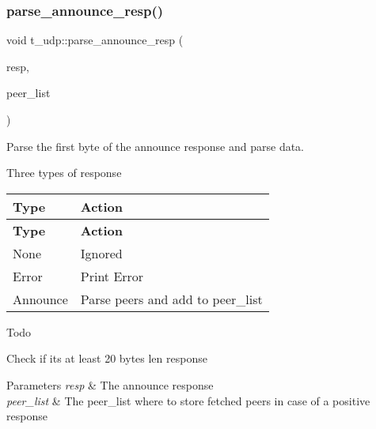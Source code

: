 \subsubsection{\texorpdfstring{parse\+\_\+announce\+\_\+resp()}{parse\_announce\_resp()}}
{\footnotesize\ttfamily void t\+\_\+udp\+::parse\+\_\+announce\+\_\+resp (\begin{DoxyParamCaption}\item[{std\+::vector$<$ uint8\+\_\+t $>$ \&}]{resp,  }\item[{\hyperlink{namespacepwp_ad07fa6df116b205302ad5ec172277184}{pwp\+::\+Peer\+List}}]{peer\+\_\+list }\end{DoxyParamCaption})}



Parse the first byte of the announce response and parse data. 

Three types of response

\tabulinesep=1mm
\begin{longtabu} spread 0pt [c]{*{2}{|X[-1]}|}
\hline
\rowcolor{\tableheadbgcolor}\textbf{ Type }&\textbf{ Action  }\\
\endfirsthead
\hline
\endfoot
\hline
\rowcolor{\tableheadbgcolor}\textbf{ Type }&\textbf{ Action  }\\
\endhead
None &Ignored \\
Error &Print Error \\
Announce &Parse peers and add to peer\+\_\+list \\
\end{longtabu}


\begin{DoxyRefDesc}{Todo}
\item[\hyperlink{todo__todo000008}{Todo}]Check if it\textquotesingle{}s at least 20 bytes len response\end{DoxyRefDesc}



\begin{DoxyParams}{Parameters}
{\em resp} & The announce response \\
\hline
{\em peer\+\_\+list} & The peer\+\_\+list where to store fetched peers in case of a positive response \\
\hline
\end{DoxyParams}
\mbox{\label{namespacet__udp_a42ced8af1acd3fb2bc46358effe48dbc}} 
